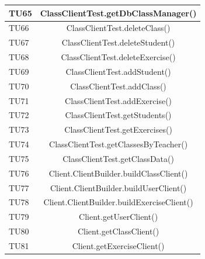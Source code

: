\begin{longtable}{|>{\centering\arraybackslash}m{1.6cm}|c|}
		TU65 & ClassClientTest.getDbClassManager()  \\ \hline
		TU66 & ClassClientTest.deleteClass()  \\ \hline
		TU67 & ClassClientTest.deleteStudent()  \\ \hline
		TU68 & ClassClientTest.deleteExercise()  \\ \hline
		TU69 & ClassClientTest.addStudent()  \\ \hline
		TU70 & ClassClientTest.addClass()  \\ \hline
		TU71 & ClassClientTest.addExercise()  \\ \hline
		TU72 & ClassClientTest.getStudents()  \\ \hline
		TU73 & ClassClientTest.getExercises()  \\ \hline
		TU74 & ClassClientTest.getClassesByTeacher()  \\ \hline
		TU75 & ClassClientTest.getClassData()  \\ \hline
		
		TU76 & Client.ClientBuilder.buildClassClient()  \\ \hline
		TU77 & Client.ClientBuilder.buildUserClient()  \\ \hline
		TU78 & Client.ClientBuilder.buildExerciseClient()  \\ \hline
		TU79 & Client.getUserClient()  \\ \hline
		TU80 & Client.getClassClient()  \\ \hline
		TU81 & Client.getExerciseClient()  \\ \hline
		

\end{longtable}
